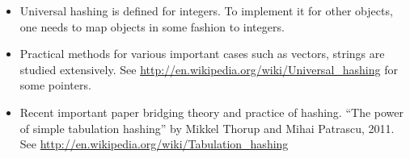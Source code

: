 \begin{itemize}
    \item Universal hashing is defined for integers. To implement it
    for other objects, one needs to map objects in some fashion to
    integers.
    
    \item Practical methods for various important cases such as
    vectors, strings are studied extensively. See
    \url{http://en.wikipedia.org/wiki/Universal_hashing} for some
    pointers.

    \item Recent important paper bridging theory and practice of
    hashing.  ``The power of simple tabulation hashing'' by Mikkel
    Thorup and Mihai Patrascu, 2011. See
    \url{http://en.wikipedia.org/wiki/Tabulation_hashing}
\end{itemize}


\nocite{mr-ra-95}



\ChapterEnd{}


